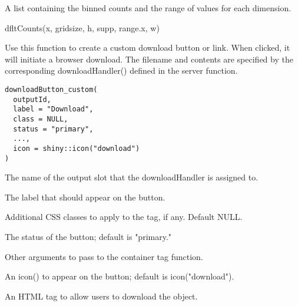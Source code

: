 \documentclass[a4paper]{book}
\begin{document}
%
\begin{Value}
A list containing the binned counts and the range of values for each dimension.
\end{Value}
%
\begin{Examples}
\begin{ExampleCode}
dfltCounts(x, gridsize, h, supp, range.x, w)
\end{ExampleCode}
\end{Examples}
%
\begin{Description}\relax
Use this function to create a custom download button or link. When clicked, it will initiate a browser download. The filename and contents are specified by the corresponding downloadHandler() defined in the server function.
\end{Description}
%
\begin{Usage}
\begin{verbatim}
downloadButton_custom(
  outputId,
  label = "Download",
  class = NULL,
  status = "primary",
  ...,
  icon = shiny::icon("download")
)
\end{verbatim}
\end{Usage}
%
\begin{Arguments}
\begin{ldescription}
\item[\code{outputId}] The name of the output slot that the downloadHandler is assigned to.

\item[\code{label}] The label that should appear on the button.

\item[\code{class}] Additional CSS classes to apply to the tag, if any. Default NULL.

\item[\code{status}] The status of the button; default is "primary."

\item[\code{...}] Other arguments to pass to the container tag function.

\item[\code{icon}] An icon() to appear on the button; default is icon("download").
\end{ldescription}
\end{Arguments}
%
\begin{Value}
An HTML tag to allow users to download the object.
\end{Value}
%
\begin{Examples}
\end{Examples}
\end{document}
